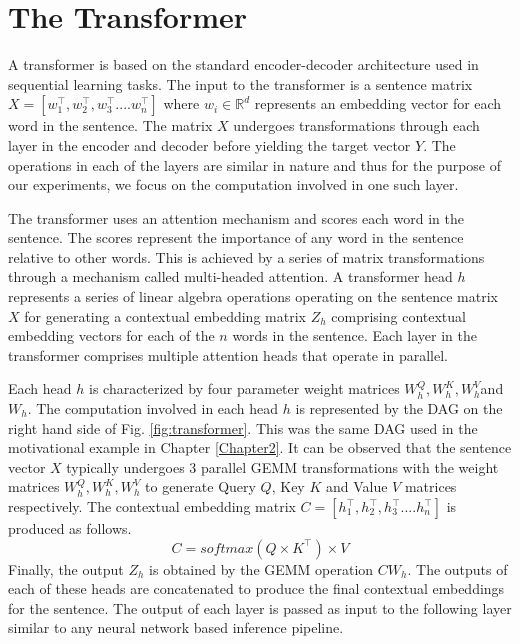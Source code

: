\section{The Transformer}
	\par A transformer is based on the standard encoder-decoder architecture used in sequential learning tasks. The input to the transformer is a sentence matrix $X = [w_{1}^\intercal,w_{2}^\intercal,w_{3}^\intercal....w_{n}^\intercal]$ where $w_i \in \mathbb{R}^d$ represents an embedding vector for each word in the sentence. The matrix $X$ undergoes transformations through each layer in the encoder and decoder before yielding the target vector $Y$. The operations in each of the layers are similar in nature and thus for the purpose of our experiments, we focus on the computation involved in one such layer. 
	\par The transformer uses an attention mechanism and scores each word in the sentence. The scores represent the importance of any word in the sentence relative to other words. This is achieved by a series of matrix transformations through a mechanism called multi-headed attention.  A transformer head $h$ represents a series of linear algebra operations operating on the sentence matrix $X$ for generating a contextual embedding matrix $Z_h$ comprising contextual embedding vectors for each of the $n$ words in the sentence. Each layer in the transformer comprises multiple attention heads that operate in parallel. 
	\par Each head $h$ is characterized by four parameter weight matrices $W_h^Q,W_h^K, W_h^V $and $W_h$. 
	The computation involved in each head $h$ is represented by the DAG on the right hand side of Fig. \ref{fig:transformer}. This was the same DAG used in the motivational example in Chapter \ref{Chapter2}. It can be observed that the sentence vector $X$ typically undergoes 3 parallel GEMM transformations with the weight matrices $W_h^Q,W_h^K, W_h^V $ to generate Query $Q$, Key $K$ and Value $V$ matrices respectively. The contextual embedding matrix $C = [h_{1}^\intercal,h_{2}^\intercal,h_{3}^\intercal....h_{n}^\intercal]$ is produced as follows.
	$$C = softmax(Q \times K^\intercal) \times V$$ 
	Finally, the output $Z_h$ is obtained by the GEMM operation $CW_h$. The outputs of each of these heads are concatenated to produce the final contextual embeddings for the sentence. The output of each layer is passed as input to the following layer similar to any neural network based inference pipeline.
	
